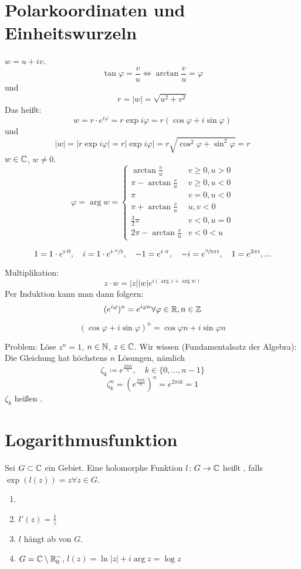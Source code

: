 \section{Polarkoordinaten und Einheitswurzeln}
$ w=u+iv $.
\[ \tan\varphi=\frac{v}{u}\Leftrightarrow\arctan\frac{v}{u}=\varphi \]
und
\[ r=|w|=\sqrt{u^2+v^2} \]
Das hei\ss t:
\[ w=r\cdot e^{i\varphi}=r\exp i\varphi=r(\cos\varphi+i\sin\varphi) \]
und
\[ |w|=|r\exp i\varphi|=r|\exp i\varphi|=r\sqrt{\cos^2\varphi+\sin^2\varphi}=r \]
$ w\in\mathbb{C} $, $ w\neq 0 $.
\[ \varphi=\arg w= \begin{cases}
\arctan\frac{v}{u}&v\geq 0,u>0\\
\pi-\arctan\frac{v}{u}&v\geq 0, u<0\\
\pi&v=0,u<0\\
\pi+\arctan\frac{v}{u}&u,v<0\\
\frac{3}{2}\pi&v<0, u=0\\
2\pi-\arctan\frac{v}{u}&v<0<u
\end{cases} \]
\begin{beispiel*}
	\[ 1=1\cdot e^{i\cdot 0},\quad i=1\cdot e^{i\cdot\sfrac{\pi}{2}},\quad -1=e^{i\cdot\pi},\quad -i=e^{\sfrac{3}{2}\pi i},\quad 1=e^{2\pi i},... \]
\end{beispiel*}
Multiplikation:
\[ z\cdot w=|z||w|e^{i(\arg z+\arg w)} \]
Per Induktion kann man dann folgern:
\[ (e^{i\varphi})^n=e^{i\varphi n}\forall\varphi\in\mathbb{R},n\in\mathbb{Z} \]
\begin{satz}
	\[ (\cos\varphi+i\sin\varphi)^n=\cos\varphi n+i\sin\varphi n \]
\end{satz}
Problem: L\"ose $ z^n=1 $, $ n\in\mathbb{N} $, $ z\in\mathbb{C} $. Wir wissen (Fundamentalsatz der Algebra): Die Gleichung hat h\"ochstens $ n $ L\"osungen, n\"amlich
\[ \zeta_k\coloneqq e^{\frac{2\pi i k}{n}},\quad k\in\lbrace 0,...,n-1\rbrace \]
\[ \zeta_k^n=\left(e^{\frac{2\pi ik}{n}}\right)^n=e^{2\pi ik}=1 \]
$ \zeta_k $ hei\ss en . 
\newpage
\section{Logarithmusfunktion}
\begin{definition}
	Sei $ G\subset\mathbb{C} $ ein Gebiet. Eine holomorphe Funktion $ l\colon G\rightarrow\mathbb{C} $ hei\ss t , falls $ \exp(l(z))=z \forall z\in G$.
\end{definition}
\begin{bemerkung*}
	\begin{enumerate}
		\item[]
		\item $ l'(z)=\frac{1}{z} $
		\item $ l $ h\"angt ab von $ G $.
		\item $ G= \mathbb{C}\setminus\mathbb{R}_0^- $, $ l(z)=\ln|z|+i\arg z =\log z$
	\end{enumerate}
\end{bemerkung*}
